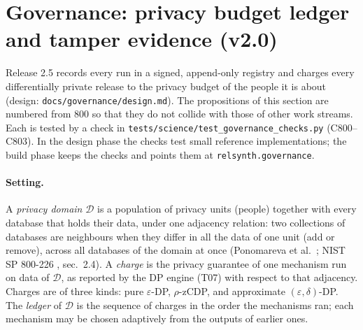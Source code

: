 \section{Governance: privacy budget ledger and tamper evidence (v2.0)}\label{sec:v25gov}
\setcounter{savedpropgov}{\value{proposition}}
Release 2.5 records every run in a signed, append-only registry and charges every differentially private release to the privacy budget of the people it is about (design: \texttt{docs/governance/design.md}). The propositions of this section are numbered from 800 so that they do not collide with those of other work streams. Each is tested by a check in \texttt{tests/science/test\_governance\_checks.py} (C800--C803). In the design phase the checks test small reference implementations; the build phase keeps the checks and points them at \texttt{relsynth.governance}.

\paragraph{Setting.} A \emph{privacy domain} $\mathcal{D}$ is a population of privacy units (people) together with every database that holds their data, under one adjacency relation: two collections of databases are neighbours when they differ in all the data of one unit (add or remove), across all databases of the domain at once (Ponomareva et al.\ \cite{ponomareva2023}; NIST SP 800-226 \cite{nist800226}, sec.~2.4). A \emph{charge} is the privacy guarantee of one mechanism run on data of $\mathcal{D}$, as reported by the DP engine (T07) with respect to that adjacency. Charges are of three kinds: pure $\varepsilon$-DP, $\rho$-zCDP, and approximate $(\varepsilon,\delta)$-DP. The \emph{ledger} of $\mathcal{D}$ is the sequence of charges in the order the mechanisms ran; each mechanism may be chosen adaptively from the outputs of earlier ones.

